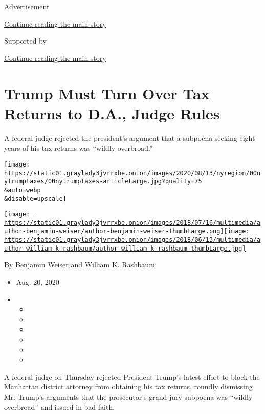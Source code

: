 Advertisement

\protect\hyperlink{after-top}{Continue reading the main story}

Supported by

\protect\hyperlink{after-sponsor}{Continue reading the main story}

\hypertarget{trump-must-turn-over-tax-returns-to-da-judge-rules}{%
\section{Trump Must Turn Over Tax Returns to D.A., Judge
Rules}\label{trump-must-turn-over-tax-returns-to-da-judge-rules}}

A federal judge rejected the president's argument that a subpoena
seeking eight years of his tax returns was ``wildly overbroad.''

\texttt{[image: https://static01.graylady3jvrrxbe.onion/images/2020/08/13/nyregion/00nytrumptaxes/00nytrumptaxes-articleLarge.jpg?quality=75\\\&auto=webp\\\&disable=upscale]}

\href{https://www.nytimes3xbfgragh.onion/by/benjamin-weiser}{\texttt{[image: https://static01.graylady3jvrrxbe.onion/images/2018/07/16/multimedia/author-benjamin-weiser/author-benjamin-weiser-thumbLarge.png]}}\href{https://www.nytimes3xbfgragh.onion/by/william-k-rashbaum}{\texttt{[image: https://static01.graylady3jvrrxbe.onion/images/2018/06/13/multimedia/author-william-k-rashbaum/author-william-k-rashbaum-thumbLarge.jpg]}}

By \href{https://www.nytimes3xbfgragh.onion/by/benjamin-weiser}{Benjamin
Weiser} and
\href{https://www.nytimes3xbfgragh.onion/by/william-k-rashbaum}{William
K. Rashbaum}

\begin{itemize}
\item
  Aug. 20, 2020
\item
  \begin{itemize}
  \item
  \item
  \item
  \item
  \item
  \item
  \end{itemize}
\end{itemize}

A federal judge on Thursday rejected President Trump's latest effort to
block the Manhattan district attorney from obtaining his tax returns,
roundly dismissing Mr. Trump's arguments that the prosecutor's grand
jury subpoena was ``wildly overbroad'' and issued in bad faith.

